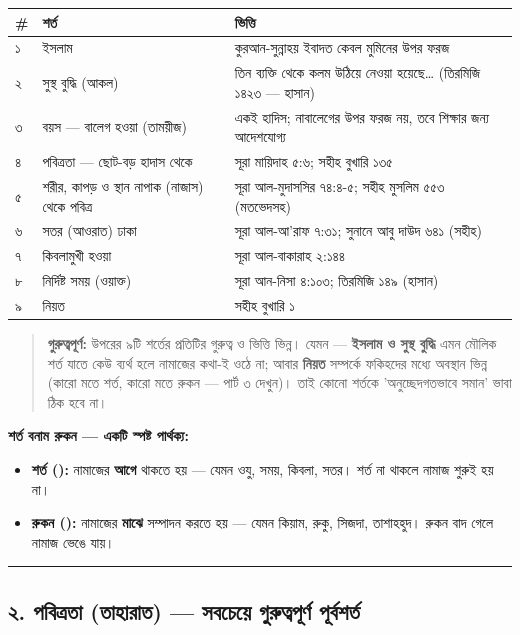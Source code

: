 \begin{table}[h]\centering\small
\begin{tabular}{lll}
\# & শর্ত & ভিত্তি \\
\hline
১ & ইসলাম & কুরআন-সুন্নাহয় ইবাদত কেবল মুমিনের উপর ফরজ \\
২ & সুস্থ বুদ্ধি (আকল) & \lat{“}তিন ব্যক্তি থেকে কলম উঠিয়ে নেওয়া হয়েছে…\lat{”} (তিরমিজি ১৪২৩ — হাসান) \\
৩ & বয়স — বালেগ হওয়া (তাময়ীজ) & একই হাদিস; নাবালেগের উপর ফরজ নয়, তবে শিক্ষার জন্য আদেশযোগ্য \\
৪ & পবিত্রতা — ছোট-বড় হাদাস থেকে & সূরা মায়িদাহ ৫:৬; সহীহ বুখারি ১৩৫ \\
৫ & শরীর, কাপড় ও স্থান নাপাক (নাজাস) থেকে পবিত্র & সূরা আল-মুদাসসির ৭৪:৪-৫; সহীহ মুসলিম ৫৫৩ (মতভেদসহ) \\
৬ & সতর (আওরাত) ঢাকা & সূরা আল-আ'রাফ ৭:৩১; সুনানে আবু দাউদ ৬৪১ (সহীহ) \\
৭ & কিবলামুখী হওয়া & সূরা আল-বাকারাহ ২:১৪৪ \\
৮ & নির্দিষ্ট সময় (ওয়াক্ত) & সূরা আন-নিসা ৪:১০৩; তিরমিজি ১৪৯ (হাসান) \\
৯ & নিয়ত & সহীহ বুখারি ১ \\
\hline
\end{tabular}
\end{table}

\begin{quote}
 \textbf{গুরুত্বপূর্ণ:} উপরের ৯টি শর্তের প্রতিটির গুরুত্ব ও ভিত্তি ভিন্ন। যেমন — \textbf{ইসলাম ও সুস্থ বুদ্ধি} এমন মৌলিক শর্ত যাতে কেউ ব্যর্থ হলে নামাজের কথা-ই ওঠে না; আবার \textbf{নিয়ত} সম্পর্কে ফকিহদের মধ্যে অবস্থান ভিন্ন (কারো মতে শর্ত, কারো মতে রুকন — পার্ট ৩ দেখুন)। তাই কোনো শর্তকে 'অনুচ্ছেদগতভাবে সমান' ভাবা ঠিক হবে না।
\end{quote}

\textbf{শর্ত বনাম রুকন — একটি স্পষ্ট পার্থক্য:}

\begin{itemize}
\item \textbf{শর্ত ():} নামাজের \textbf{আগে} থাকতে হয় — যেমন ওযু, সময়, কিবলা, সতর। শর্ত না থাকলে নামাজ শুরুই হয় না।
\item \textbf{রুকন ():} নামাজের \textbf{মাঝে} সম্পাদন করতে হয় — যেমন কিয়াম, রুকু, সিজদা, তাশাহহুদ। রুকন বাদ গেলে নামাজ ভেঙে যায়।
\end{itemize}
\medskip\hrule\medskip

\subsection*{২. পবিত্রতা (তাহারাত) — সবচেয়ে গুরুত্বপূর্ণ পূর্বশর্ত}

